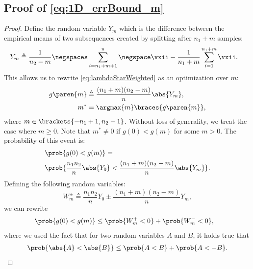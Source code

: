 \subsection{Proof of \eqref{eq:1D_errBound_m}}\label{sec:proof:1D_errBound_m}
\begin{proof}
Define the random variable
$Y_m$ which is the difference between the empirical means of two
subsequences created by splitting after $n_1+m$ samples:
\begin{align*}
    Y_m &\triangleq\frac{1}{n_2-m}\negspaces\sum_{i=n_1+m+1}^{n}\negspace\vxii-\frac{1}{n_1+m}\sum_{i=1}^{n_1+m}\vxii.
\end{align*}
This allows us to rewrite
\eqref{eq:lambdaStarWeighted} as an optimization over $m$:
\begin{align*}%
    g\paren{m} &\triangleq \frac{(n_1+m)(n_2-m)}{n}\abs{Y_m},\\
    m^* &=\argmax{m}\braces{g\paren{m}},
\end{align*}
where $m\in\brackets{-n_1+1,n_2-1}$.
Without loss of generality, we treat the case where
$m\geq0$. Note that $m^*\neq0$ if $g(0)<g(m)$ for some $m>0$.
The probability of this event is:
\begin{align}\label{eq:correctBoundaryErrProb}
    &\prob{g(0) < g(m)}=\\
    &\prob{\frac{n_1n_2}{n}\abs{Y_0}<\frac{(n_1+m)(n_2-m)}{n}\abs{Y_m}}.\nonumber
\end{align}
Defining the following random variables:
\begin{equation}\label{eq:Wdef}
    W_m^{\pm}\triangleq\frac{n_1n_2}{n}Y_0\pm\frac{(n_1+m)(n_2-m)}{n}Y_m,
\end{equation}
we can rewrite
\begin{align}\label{eq:errBound_asW}
    \prob{g(0)<g(m)} & \leq\prob{W_m^{+}<0}+\prob{W_m^{-}<0},%
\end{align}
where we used the fact that
for two random variables $A$ and $B$, it holds true that
\begin{align*}%
    \prob{\abs{A}<\abs{B}}\leq\prob{A<B}+\prob{A<-B}.

\end{align*}
\end{proof}
